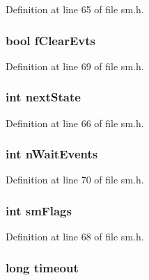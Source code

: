 Definition at line 65 of file sm.h.

\hypertarget{struct_s_m_a4ed076f11e5fce48ed3663d59456af2b}{
\subsubsection[{fClearEvts}]{\setlength{\rightskip}{0pt plus 5cm}bool {\bf fClearEvts}}}
\label{struct_s_m_a4ed076f11e5fce48ed3663d59456af2b}


Definition at line 69 of file sm.h.

\hypertarget{struct_s_m_a18e5a6ae4af63222c56c48bdb1161080}{
\subsubsection[{nextState}]{\setlength{\rightskip}{0pt plus 5cm}int {\bf nextState}}}
\label{struct_s_m_a18e5a6ae4af63222c56c48bdb1161080}


Definition at line 66 of file sm.h.

\hypertarget{struct_s_m_a8cae14ab3b0fb7c0aaf3c8f4e6a374a1}{
\subsubsection[{nWaitEvents}]{\setlength{\rightskip}{0pt plus 5cm}int {\bf nWaitEvents}}}
\label{struct_s_m_a8cae14ab3b0fb7c0aaf3c8f4e6a374a1}


Definition at line 70 of file sm.h.

\hypertarget{struct_s_m_aa0b5dc80983d3debd32a307496d90982}{
\subsubsection[{smFlags}]{\setlength{\rightskip}{0pt plus 5cm}int {\bf smFlags}}}
\label{struct_s_m_aa0b5dc80983d3debd32a307496d90982}


Definition at line 68 of file sm.h.

\hypertarget{struct_s_m_a0eb73e1ac837828209a5b842000fa3b0}{
\subsubsection[{timeout}]{\setlength{\rightskip}{0pt plus 5cm}long {\bf timeout}}}
\label{struct_s_m_a0eb73e1ac837828209a5b842000fa3b0}


